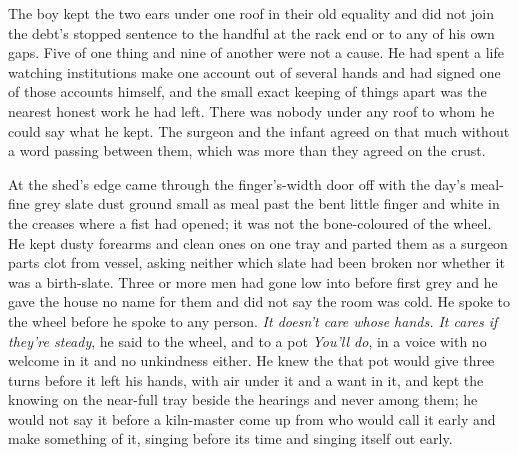 The boy kept the two ears under one roof in their old equality and did not join the debt's stopped sentence to the handful at the rack end or to any of his own gaps. Five of one thing and nine of another were not a cause. He had spent a life watching institutions make one account out of several hands and had signed one of those accounts himself, and the small exact keeping of things apart was the nearest honest work he had left. There was nobody under any roof to whom he could say what he kept. The surgeon and the infant agreed on that much without a word passing between them, which was more than they agreed on the crust.

At the shed's edge  came through the finger's-width door off  with the day's meal-fine grey slate dust ground small as meal past the bent little finger and white in the creases where a fist had opened; it was not the bone-coloured  of the wheel. He kept dusty forearms and clean ones on one tray and parted them as a surgeon parts clot from vessel, asking neither which slate had been broken nor whether it was a birth-slate. Three or more men had gone low into  before first grey and he gave the house no name for them and did not say the room was cold. He spoke to the wheel before he spoke to any person. \emph{It doesn't care whose hands. It cares if they're steady}, he said to the wheel, and to a pot \emph{You'll do}, in a voice with no welcome in it and no unkindness either. He knew the  that pot would give three turns before it left his hands, with air under it and a want in it, and kept the knowing on the near-full tray beside the hearings and never among them; he would not say it before a kiln-master come up from  who would call it early and make something of it, singing before its time and singing itself out early.

